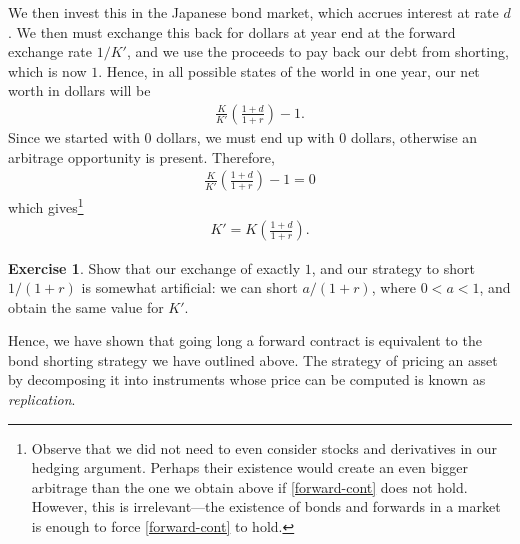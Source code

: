 \documentclass[12pt]{article}
\theoremstyle{plain}
\theoremstyle{definition}
\newtheorem*{exercise}{Exercise}
\theoremstyle{remark}
\numberwithin{equation}{section}  %
\begin{document}
    We then invest this in the Japanese bond market, which accrues interest at rate $d$. We then must exchange this back for dollars at year end at the forward exchange rate $1/K'$, and we use the proceeds to pay back our debt from shorting, which is now $1$. Hence, in all possible states of the world in one year, our net worth in dollars will be
    \begin{equation*}
    \begin{split}
        \frac{K}{K'} \left( \frac{1+d}{1+r} \right) -  1.
    \end{split}
    \end{equation*}
    Since we started with $0$ dollars, we must end up with $0$ dollars,  otherwise an arbitrage opportunity is present. Therefore,
    \begin{equation*}
    \begin{split}
        \frac{K}{K'} \left( \frac{1+d}{1+r} \right) -  1=0
    \end{split}
    \end{equation*}
which gives\footnote{Observe that we did not need to even consider stocks
and derivatives in our hedging argument. Perhaps their existence would
create an even bigger arbitrage than the one we obtain above if
\eqref{forward-cont} does not hold. However, this is irrelevant---the
existence of bonds and forwards in a market is enough to force
\eqref{forward-cont} to hold.}
    \begin{equation}
        \label{forward-cont}
    \begin{split}
        K' = K\left( \frac{1+d}{1+r} \right). 
    \end{split}
    \end{equation}
    \begin{exercise}
     Show that our exchange of exactly $1$, and our strategy to short $1/(1+r)$ is somewhat artificial: we can short $a/(1+r)$, where $0 < a < 1$, and obtain the same
value for $K'$.
    \end{exercise}
    Hence, we have shown that going long a forward contract is equivalent
    to the bond shorting strategy we have outlined above. The strategy of pricing an asset by decomposing it into instruments whose price can be computed is known as \emph{replication}.
\end{document}
